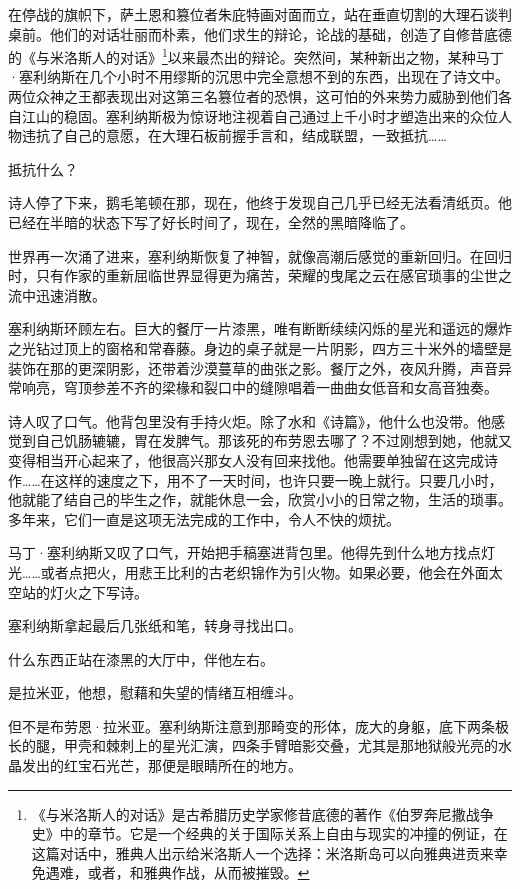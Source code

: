 \documentclass[AutoFakeBold=true]{book}
\begin{document}
在停战的旗帜下，萨土恩和篡位者朱庇特画对面而立，站在垂直切割的大理石谈判桌前。他们的对话壮丽而朴素，他们求生的辩论，论战的基础，创造了自修昔底德的《与米洛斯人的对话》\footnote{《与米洛斯人的对话》是古希腊历史学家修昔底德的著作《伯罗奔尼撒战争史》中的章节。它是一个经典的关于国际关系上自由与现实的冲撞的例证，在这篇对话中，雅典人出示给米洛斯人一个选择：米洛斯岛可以向雅典进贡来幸免遇难，或者，和雅典作战，从而被摧毁。}以来最杰出的辩论。突然间，某种新出之物，某种马丁·塞利纳斯在几个小时不用缪斯的沉思中完全意想不到的东西，出现在了诗文中。两位众神之王都表现出对这第三名篡位者的恐惧，这可怕的外来势力威胁到他们各自江山的稳固。塞利纳斯极为惊讶地注视着自己通过上千小时才塑造出来的众位人物违抗了自己的意愿，在大理石板前握手言和，结成联盟，一致抵抗……

抵抗什么？

诗人停了下来，鹅毛笔顿在那，现在，他终于发现自己几乎已经无法看清纸页。他已经在半暗的状态下写了好长时间了，现在，全然的黑暗降临了。

世界再一次涌了进来，塞利纳斯恢复了神智，就像高潮后感觉的重新回归。在回归时，只有作家的重新屈临世界显得更为痛苦，荣耀的曳尾之云在感官琐事的尘世之流中迅速消散。

塞利纳斯环顾左右。巨大的餐厅一片漆黑，唯有断断续续闪烁的星光和遥远的爆炸之光钻过顶上的窗格和常春藤。身边的桌子就是一片阴影，四方三十米外的墙壁是装饰在那的更深阴影，还带着沙漠蔓草的曲张之影。餐厅之外，夜风升腾，声音异常响亮，穹顶参差不齐的梁椽和裂口中的缝隙唱着一曲曲女低音和女高音独奏。

诗人叹了口气。他背包里没有手持火炬。除了水和《诗篇》，他什么也没带。他感觉到自己饥肠辘辘，胃在发脾气。{\kaishu 那该死的布劳恩去哪了？}不过刚想到她，他就又变得相当开心起来了，他很高兴那女人没有回来找他。他需要单独留在这完成诗作……在这样的速度之下，用不了一天时间，也许只要一晚上就行。只要几小时，他就能了结自己的毕生之作，就能休息一会，欣赏小小的日常之物，生活的琐事。多年来，它们一直是这项无法完成的工作中，令人不快的烦扰。

马丁·塞利纳斯又叹了口气，开始把手稿塞进背包里。他得先到什么地方找点灯光……或者点把火，用悲王比利的古老织锦作为引火物。如果必要，他会在外面太空站的灯火之下写诗。

塞利纳斯拿起最后几张纸和笔，转身寻找出口。

什么东西正站在漆黑的大厅中，伴他左右。

是拉米亚，他想，慰藉和失望的情绪互相缠斗。

但不是布劳恩·拉米亚。塞利纳斯注意到那畸变的形体，庞大的身躯，底下两条极长的腿，甲壳和棘刺上的星光汇演，四条手臂暗影交叠，尤其是那地狱般光亮的水晶发出的红宝石光芒，那便是眼睛所在的地方。
\end{document}
